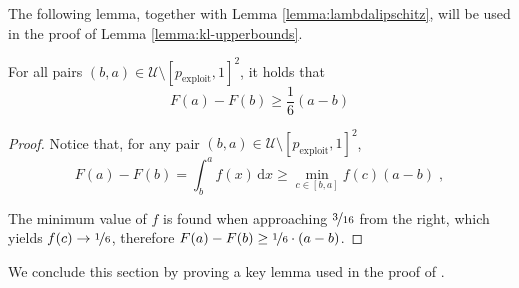 \documentclass[final,12pt]{colt2025}
\newcommand{\cU}{\mathcal{U}}
\newcommand{\dif}{\,\mathrm{d}}
\newcommand{\nb}{b}
\newcommand{\ns}{a}
\begin{document}
The following lemma, together with Lemma \ref{lemma:lambdalipschitz}, will be used in the proof of Lemma \ref{lemma:kl-upperbounds}.

\begin{lemma}\label{lemma:Lprimebound}
    For all pairs $(\nb, \ns) \in \cU \setminus [p_\text{exploit},1]^2$, it holds that
    \[
        F(\ns) - F(\nb) \ge \frac{1}{6} (\ns - \nb)
    \]
\end{lemma}
\begin{proof}
    Notice that, for any pair $(\nb,\ns) \in \cU\setminus [p_\text{exploit},1]^2$,
    \[
        F(\ns) - F(\nb) = \int_\nb^\ns f(x) \dif x \ge \min_{c \in [\nb,\ns]} f(c) (\ns - \nb)\;,
    \]

    The minimum value of $f$ is found when approaching $\nicefrac{3}{16}$ from the right, which yields $f(c) \rightarrow \nicefrac{1}{6}$, therefore $F(\ns) - F(\nb) \ge \nicefrac{1}{6}\cdot(\ns - \nb)$.
\end{proof}

We conclude this section by proving a key lemma used in the proof of .
\end{document}
